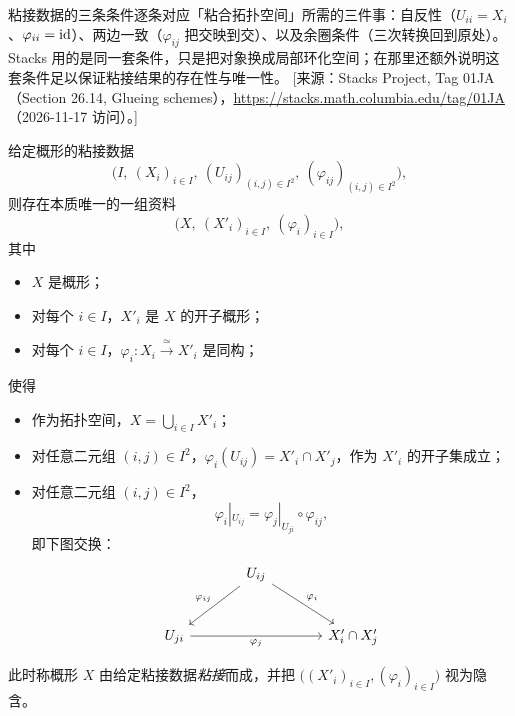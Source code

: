 \begin{yizhu}
粘接数据的三条条件逐条对应「粘合拓扑空间」所需的三件事：自反性（$U_{ii}=X_i$、$\varphi_{ii}=\operatorname{id}$）、两边一致（$\varphi_{ij}$ 把交映到交）、以及余圈条件（三次转换回到原处）。Stacks 用的是同一套条件，只是把对象换成局部环化空间；在那里还额外说明这套条件足以保证粘接结果的存在性与唯一性。
[来源：Stacks Project, Tag 01JA（Section 26.14, Glueing schemes），\url{https://stacks.math.columbia.edu/tag/01JA}（2026-11-17 访问）。]
\end{yizhu}

\begin{propdef}\label{prop:6.1.2}
给定概形的粘接数据
\[
\bigl(I,\ (X_i)_{i\in I},\ (U_{ij})_{(i,j)\in I^2},\ (\varphi_{ij})_{(i,j)\in I^2}\bigr),
\]
则存在本质唯一的一组资料
\[
\bigl(X,\ (X'_i)_{i\in I},\ (\varphi_i)_{i\in I}\bigr),
\]
其中
\begin{itemize}[leftmargin=1.6em,itemsep=0.2ex]
  \item $X$ 是概形；
  \item 对每个 $i\in I$，$X'_i$ 是 $X$ 的开子概形；
  \item 对每个 $i\in I$，$\varphi_i:X_i\xrightarrow{\ \simeq\ }X'_i$ 是同构；
\end{itemize}
使得
\begin{itemize}[leftmargin=1.6em,itemsep=0.2ex]
  \item 作为拓扑空间，$X=\bigcup_{i\in I}X'_i$；
  \item 对任意二元组 $(i,j)\in I^2$，$\varphi_i(U_{ij})=X'_i\cap X'_j$，作为 $X'_i$ 的开子集成立；
  \item 对任意二元组 $(i,j)\in I^2$，
\[
\varphi_i|_{U_{ij}}=\varphi_j|_{U_{ji}}\circ\varphi_{ij},
\]
即下图交换：
\[
\begin{tikzcd}[column sep=large,row sep=large]
& U_{ij}\arrow[dl,"\varphi_{ij}"']\arrow[dr,"\varphi_i"] & \\
U_{ji}\arrow[rr,"\varphi_j"'] & {} & X'_i\cap X'_j
\end{tikzcd}
\]
\end{itemize}
此时称概形 $X$ 由给定粘接数据\emph{粘接}而成，并把 $\bigl((X'_i)_{i\in I},(\varphi_i)_{i\in I}\bigr)$ 视为隐含。
\end{propdef}

